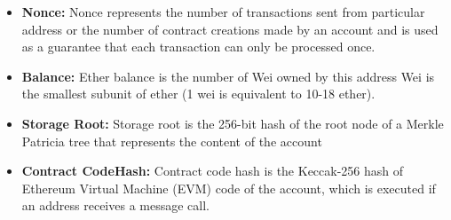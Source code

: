         \begin{itemize}
            \item \textbf{Nonce:} Nonce represents the number of transactions sent from particular address or the number of contract creations made by an account and is used as a guarantee that each transaction can only be processed once.
            \item \textbf{Balance:} Ether balance is the number of Wei owned by this address
                Wei is the smallest subunit of ether (1 wei is equivalent to 10-18 ether).
            \item \textbf{Storage Root:} Storage root is the 256-bit hash of the root node of a Merkle Patricia tree that represents the content of the account 
            \item \textbf{Contract CodeHash:} Contract code hash is the Keccak-256 hash of Ethereum Virtual Machine (EVM) code of the account, which is executed if an address receives a message call.
        \end{itemize}


